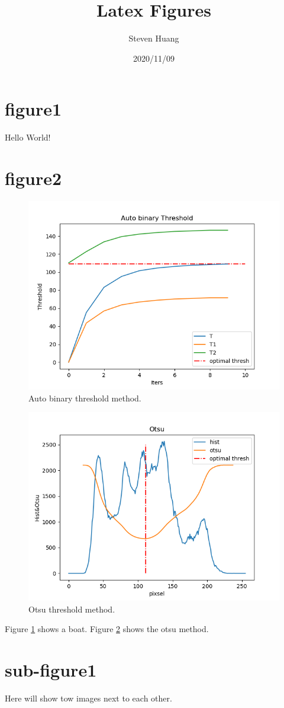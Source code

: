 \documentclass{article}
\title{ Latex Figures}
\date{2020/11/09}
\author{Steven Huang}
\begin{document}
\maketitle
\newpage
{}

\section{figure1}
Hello World!
\section{figure2}
\begin{figure}[htb!] %
  \centering
  \includegraphics[width=0.5\linewidth]{autoThres.png}
  \caption{Auto binary threshold method.}
  \label{fig:bin1}
\end{figure}

\begin{figure}[htb!] %
  \centering
  \includegraphics[width=0.5\linewidth]{otsu.png}
  \caption{Otsu threshold method.}
  \label{fig:Otsu1}
\end{figure}

Figure \ref{fig:bin1} shows a boat. 
Figure \ref{fig:Otsu1} shows the otsu method.

\section{sub-figure1}
Here will show tow images next to each other.
\end{document}
